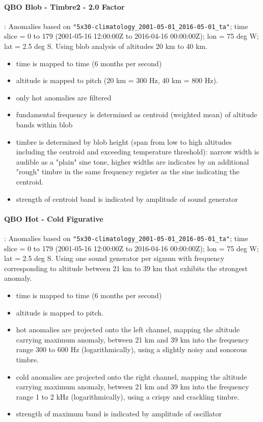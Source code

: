 \documentclass[11pt,a4paper]{article}
\begin{document}
\paragraph{QBO Blob - Timbre2 - 2.0 Factor}:
Anomalies based on \Verb!"5x30-climatology_2001-05-01_2016-05-01_ta"!; time slice = 0 to 179 (2001-05-16 12:00:00Z to 2016-04-16 00:00:00Z); lon = 75 deg W; lat = 2.5 deg S. Using blob analysis of altitudes 20 km to 40 km.
%
\begin{itemize}
\item time is mapped to time (6 months per second)
\item altitude is mapped to pitch (20 km = 300 Hz, 40 km = 800 Hz).
\item only hot anomalies are filtered
\item fundamental frequency is determined as centroid (weighted mean) of altitude bands within blob
\item timbre is determined by blob height (span from low to high altitudes including the centroid and exceeding temperature threshold): narrow width is audible as a "plain" sine tone, higher widths are indicates by an additional "rough" timbre in the same frequency register as the sine indicating the centroid.
\item strength of centroid band is indicated by amplitude of sound generator
\end{itemize}

\paragraph{QBO Hot - Cold Figurative}:
Anomalies based on \Verb!"5x30-climatology_2001-05-01_2016-05-01_ta"!; time slice = 0 to 179 (2001-05-16 12:00:00Z to 2016-04-16 00:00:00Z); lon = 75 deg W; lat = 2.5 deg S. Using one sound generator per signum with frequency corresponding to altitude between 21 km to 39 km that exhibits the strongest anomaly.
%
\begin{itemize}
\item time is mapped to time (6 months per second)
\item altitude is mapped to pitch.
\item hot anomalies are projected onto the left channel, mapping
the altitude carrying maximum anomaly, between 21 km and 39 km
into the frequency range 300 to 600 Hz (logarithmically), using
a slightly noisy and sonorous timbre.
\item cold anomalies are projected onto the right channel, mapping
the altitude carrying maximum anomaly, between 21 km and 39 km
into the frequency range 1 to 2 kHz (logarithmically), using
a crispy and crackling timbre.
\item strength of maximum band is indicated by amplitude of oscillator
\end{itemize}
\end{document}
